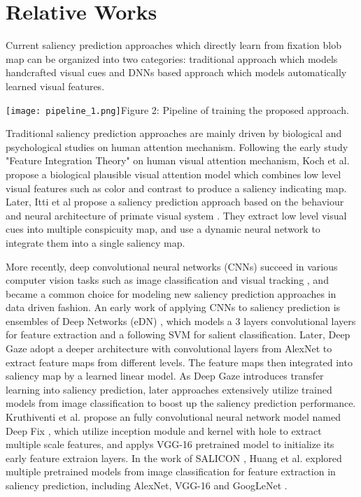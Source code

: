 \documentclass[letterpaper, 10 pt, conference]{ieeeconf}  %
\begin{document}
\section{Relative Works}

\par Current saliency prediction approaches which directly learn from fixation blob map can be organized into two categories: traditional approach which models handcrafted visual cues and DNNs based approach which models automatically learned visual features.

\begin{figure*}[!t]
\centering
    \texttt{[image: pipeline\_1.png]}{Figure 2: Pipeline of training the proposed approach.\label{fig2}}
\end{figure*}

\par Traditional saliency prediction approaches are mainly driven by biological and psychological studies on human attention mechanism. Following the early study "Feature Integration Theory" \cite{b8} on human visual attention mechanism, Koch et al. propose a biological plausible visual attention model \cite{b9} which combines low level visual features such as color and contrast to produce a saliency indicating map. Later, Itti et al propose a saliency prediction approach based on the behaviour and neural architecture of primate visual system \cite{b10}. They extract low level visual cues into multiple conspicuity map, and use a dynamic neural network to integrate them into a single saliency map.

\par More recently, deep convolutional neural networks (CNNs) succeed in various computer vision tasks such as image classification \cite{b11,b12} and visual tracking \cite{b13,b14}, and became a common choice for modeling new saliency prediction approaches in data driven fashion. An early work of applying CNNs to saliency prediction is ensembles of Deep Networks (eDN) \cite{b15}, which models a 3 layers convolutional layers for feature extraction and a following SVM for salient classification. Later, Deep Gaze \cite{b16} adopt a deeper architecture with convolutional layers from AlexNet \cite{b17} to extract feature maps from different levels. The feature maps then integrated into saliency map by a learned linear model. As Deep Gaze introduces transfer learning into saliency prediction, later approaches extensively utilize trained models from image classification to boost up the saliency prediction performance. Kruthiventi et al. propose an fully convolutional neural network model named Deep Fix \cite{b6}, which utilize inception module and kernel with hole to extract multiple scale features, and applys VGG-16 \cite{b11} pretrained model to initialize its early feature extraion layers. In the work of SALICON \cite{b19}, Huang et al. explored multiple pretrained models from image classification for feature extraction in saliency prediction, including AlexNet, VGG-16 and GoogLeNet \cite{b20}.
\end{document}

